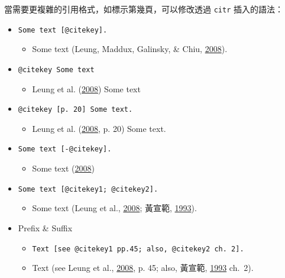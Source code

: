 \documentclass[oneside]{book}
\providecommand{\tightlist}{%
  \setlength{\itemsep}{0pt}\setlength{\parskip}{0pt}}
\theoremstyle{definition}
\theoremstyle{definition}
\theoremstyle{definition}
\theoremstyle{remark}
\begin{document}
當需要更複雜的引用格式，如標示第幾頁，可以修改透過 \texttt{citr} 插入的語法：

\begin{itemize}
\tightlist
\item
  \texttt{Some\ text\ {[}@citekey{]}.}

  \begin{itemize}
  \tightlist
  \item
    Some text (Leung, Maddux, Galinsky, \& Chiu, \protect\hyperlink{ref-leung2008}{2008}).
  \end{itemize}
\item
  \texttt{@citekey\ Some\ text}

  \begin{itemize}
  \tightlist
  \item
    Leung et al. (\protect\hyperlink{ref-leung2008}{2008}) Some text
  \end{itemize}
\item
  \texttt{@citekey\ {[}p.\ 20{]}\ Some\ text.}

  \begin{itemize}
  \tightlist
  \item
    Leung et al. (\protect\hyperlink{ref-leung2008}{2008}, p. 20) Some text.
  \end{itemize}
\item
  \texttt{Some\ text\ {[}-@citekey{]}.}

  \begin{itemize}
  \tightlist
  \item
    Some text (\protect\hyperlink{ref-leung2008}{2008})
  \end{itemize}
\item
  \texttt{Some\ text\ {[}@citekey1;\ @citekey2{]}.}

  \begin{itemize}
  \tightlist
  \item
    Some text (Leung et al., \protect\hyperlink{ref-leung2008}{2008}; 黃宣範, \protect\hyperlink{ref-huangxuanfan1993}{1993}).
  \end{itemize}
\item
  Prefix \& Suffix

  \begin{itemize}
  \tightlist
  \item
    \texttt{Text\ {[}see\ @citekey1\ pp.45;\ also,\ @citekey2\ ch.\ 2{]}.}
  \item
    Text (see Leung et al., \protect\hyperlink{ref-leung2008}{2008}, p. 45; also, 黃宣範, \protect\hyperlink{ref-huangxuanfan1993}{1993} ch.~2).
  \end{itemize}
\end{itemize}
\end{document}
